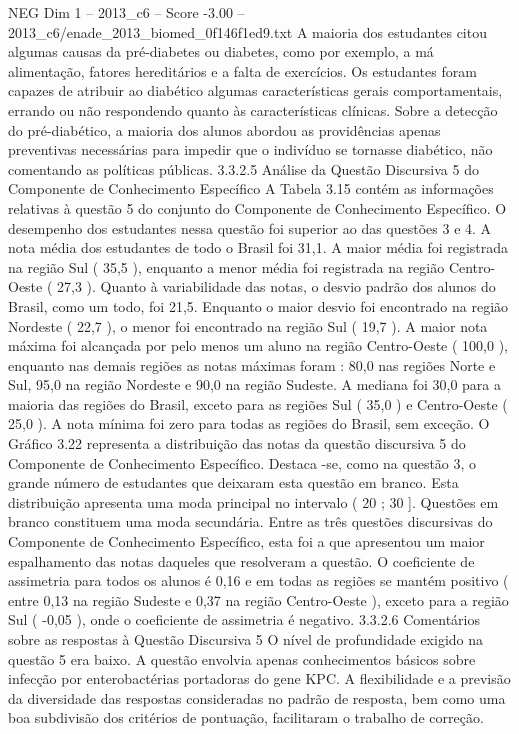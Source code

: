 \begin{textsample}{NEG Dim 1 – 2013\_c6 – Score -3.00 – 2013\_c6/enade\_2013\_biomed\_0f146f1ed9.txt}
A maioria dos estudantes citou algumas causas da pré-diabetes ou diabetes, como por exemplo, a má alimentação, fatores hereditários e a falta de exercícios.
Os estudantes foram capazes de atribuir ao diabético algumas características gerais comportamentais, errando ou não respondendo quanto às características clínicas.
Sobre a detecção do pré-diabético, a maioria dos alunos abordou as providências apenas preventivas necessárias para impedir que o indivíduo se tornasse diabético, não comentando as políticas públicas. 3.3.2.5 Análise da Questão Discursiva 5 do Componente de Conhecimento Específico A Tabela 3.15 contém as informações relativas à questão 5 do conjunto do Componente de Conhecimento Específico.
O desempenho dos estudantes nessa questão foi superior ao das questões 3 e 4.
A nota média dos estudantes de todo o Brasil foi 31,1.
A maior média foi registrada na região Sul ( 35,5 ), enquanto a menor média foi registrada na região Centro-Oeste ( 27,3 ).
Quanto à variabilidade das notas, o desvio padrão dos alunos do Brasil, como um todo, foi 21,5.
Enquanto o maior desvio foi encontrado na região Nordeste ( 22,7 ), o menor foi encontrado na região Sul ( 19,7 ).
A maior nota máxima foi alcançada por pelo menos um aluno na região Centro-Oeste ( 100,0 ), enquanto nas demais regiões as notas máximas foram : 80,0 nas regiões Norte e Sul, 95,0 na região Nordeste e 90,0 na região Sudeste.
A mediana foi 30,0 para a maioria das regiões do Brasil, exceto para as regiões Sul ( 35,0 ) e Centro-Oeste ( 25,0 ).
A nota mínima foi zero para todas as regiões do Brasil, sem exceção.
O Gráfico 3.22 representa a distribuição das notas da questão discursiva 5 do Componente de Conhecimento Específico.
Destaca -se, como na questão 3, o grande número de estudantes que deixaram esta questão em branco.
Esta distribuição apresenta uma moda principal no intervalo ( 20 ; 30 ].
Questões em branco constituem uma moda secundária.
Entre as três questões discursivas do Componente de Conhecimento Específico, esta foi a que apresentou um maior espalhamento das notas daqueles que resolveram a questão.
O coeficiente de assimetria para todos os alunos é 0,16 e em todas as regiões se mantém positivo ( entre 0,13 na região Sudeste e 0,37 na região Centro-Oeste ), exceto para a região Sul ( -0,05 ), onde o coeficiente de assimetria é negativo. 3.3.2.6 Comentários sobre as respostas à Questão Discursiva 5 O nível de profundidade exigido na questão 5 era baixo.
A questão envolvia apenas conhecimentos básicos sobre infecção por enterobactérias portadoras do gene KPC.
A flexibilidade e a previsão da diversidade das respostas consideradas no padrão de resposta, bem como uma boa subdivisão dos critérios de pontuação, facilitaram o trabalho de correção.

\end{textsample}
